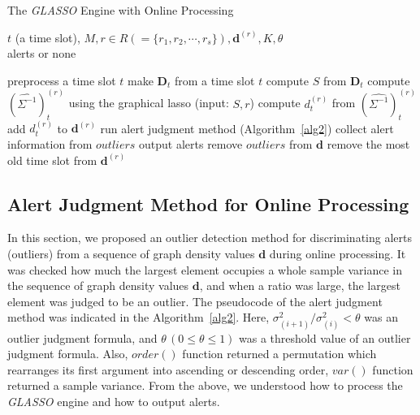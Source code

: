 \documentclass[conference]{IEEEtran}
\begin{document}

\begin{algorithm}[tb]
\caption{The {\it GLASSO} Engine with Online Processing}
\label{alg1}
\begin{algorithmic}[1]
  \REQUIRE $t$ (a time slot), $M, r \in R ( = \{r_1, r_2, \cdots, r_s\} ), \bm{d}^{(r)}, K, \theta$\\
  \ENSURE alerts or none

    \STATE preprocess a time slot $t$
    \STATE make $\bm{D}_t$ from a time slot $t$
    \STATE compute $S$ from $\bm{D}_t$
      \STATE compute ${(\hat{\Sigma^{-1}})}_t^{(r)}$ using the graphical lasso (input: $S,r$)
      \STATE compute $d_t^{(r)}$ from ${(\hat{\Sigma^{-1}})}_t^{(r)}$
      \STATE add $d_t^{(r)}$ to $\bm{d}^{(r)}$
        \STATE run alert judgment method (Algorithm~\ref{alg2})
          \STATE collect alert information from $outliers$
          \STATE output alerts
          \STATE remove $outliers$ from $\bm{d}$
        \ELSE
          \STATE remove the most old time slot from $\bm{d}^{(r)}$
        \ENDIF
  		\ENDIF
  	\ENDFOR
  \ENDFOR
\end{algorithmic}
\end{algorithm}





\subsection{Alert Judgment Method for Online Processing}
In this section, we proposed an outlier detection method for discriminating alerts (outliers) from a sequence of graph density values $\bm{d}$ during online processing.
It was checked how much the largest element occupies a whole sample variance in the sequence of graph density values $\bm{d}$, and when a ratio was large, the largest element was judged to be an outlier.
The pseudocode of the alert judgment method was indicated in the Algorithm~\ref{alg2}.
Here, $\sigma^{2}_{(i+1)}/\sigma^{2}_{(i)}<\theta$ was an outlier judgment formula, and $\theta \, (0\leq \theta \leq 1)$ was a threshold value of an outlier judgment formula.
Also, $order()$ function returned a permutation which rearranges its first argument into ascending or descending order, $var()$ function returned a sample variance.
From the above, we understood how to process the {\it GLASSO} engine and how to output alerts.
\end{document}
